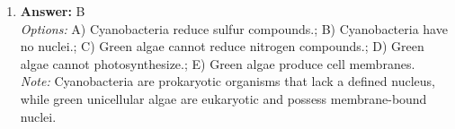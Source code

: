 \documentclass[12pt]{article}
\begin{document}
\begin{enumerate}[label=\arabic*.]
\\ \textit{Note:} Referring to protozoans as belonging to a single animal phylum overlooks their extreme diversity in forms and functions, complicates taxonomic organization due to their varied evolutionary relationships, and fails to recognize that some exhibit plant-like features, highlighting the inadequacy of a singular classification.
\item \textbf{Answer:} B
\\ \textit{Options:} A) Cyanobacteria reduce sulfur compounds.; B) Cyanobacteria have no nuclei.; C) Green algae cannot reduce nitrogen compounds.; D) Green algae cannot photosynthesize.; E) Green algae produce cell membranes.
\\ \textit{Note:} Cyanobacteria are prokaryotic organisms that lack a defined nucleus, while green unicellular algae are eukaryotic and possess membrane-bound nuclei.
\end{enumerate}
\end{document}
